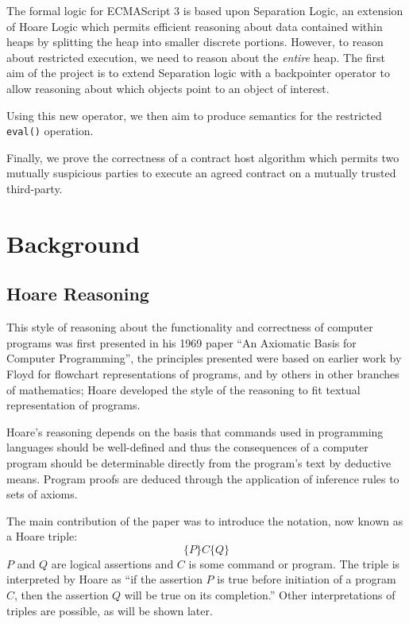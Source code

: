 \documentclass[a4paper]{report}
\begin{document}
  The formal logic for ECMAScript 3 is based upon Separation Logic, an extension
  of Hoare Logic which permits efficient reasoning about data contained within
  heaps by splitting the heap into smaller discrete portions. However, to reason
  about restricted execution, we need to reason about the \emph{entire}
  heap. The first aim of the project is to extend Separation logic with a
  backpointer operator to allow reasoning about which objects point to an
  object of interest.

  Using this new operator, we then aim to produce semantics for the restricted
  \texttt{eval()} operation.

  Finally, we prove the correctness of a contract host algorithm which permits
  two mutually suspicious parties to execute an agreed contract on a mutually
  trusted third-party.




\chapter{Background}
\section{Hoare Reasoning}
  This style of reasoning about the functionality and correctness of computer
  programs was first presented in his 1969 paper ``An Axiomatic Basis for
  Computer Programming''\cite{Hoare1969Axiom}, the principles presented were
  based on earlier work by Floyd\cite{floyd1967assigning} for flowchart
  representations of programs, and by others in other branches of mathematics;
  Hoare developed the style of the reasoning to fit textual representation of
  programs.

  Hoare's reasoning depends on the basis that commands used in programming
  languages should be well-defined and thus the consequences of a computer
  program should be determinable directly from the program's text by deductive
  means. Program proofs are deduced through the application of inference rules
  to sets of axioms.

  The main contribution of the paper was to introduce the notation, now known as
  a Hoare triple:
    \[ \{P\} C \{Q\} \]
  $P$ and $Q$ are logical assertions and $C$ is some command or program. The
  triple is interpreted by Hoare as ``if the assertion $P$ is true before
  initiation of a program $C$, then the assertion $Q$ will be true on its
  completion.'' Other interpretations of triples are possible, as will be shown
  later.
\end{document}
